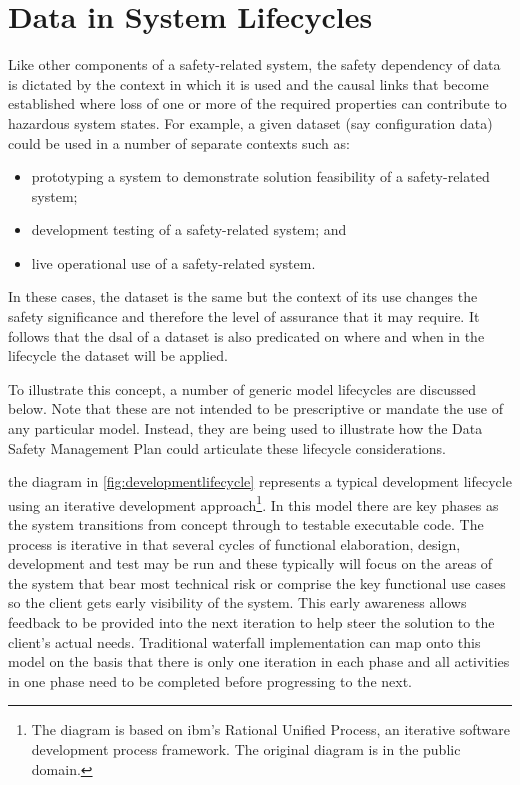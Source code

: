 \section{Data in System Lifecycles}
Like other components of a safety-related system, the safety dependency of data is dictated by the context in which it is used and the causal links that become established where loss of one or more of the required properties can contribute to hazardous system states. For example, a given \gls{dataset} (say \gls{configuration data}) could be used in a number of separate contexts such as:
\begin{itemize}
  \item prototyping a system to demonstrate solution feasibility of a safety-related system;
  \item development testing of a safety-related system; and
  \item live operational use of a safety-related system.
\end{itemize}

In these cases, the \gls{dataset} is the same but the context of its use changes the safety significance and therefore the level of assurance that it may require. It follows that the \gls{dsal} of a \gls{dataset} is also predicated on where and when in the lifecycle the \gls{dataset} will be applied. 

To illustrate this concept, a number of generic model lifecycles are discussed below. Note that these are not intended to be prescriptive or mandate the use of any particular model. Instead, they are being used to illustrate how the Data Safety Management Plan could articulate these lifecycle considerations.

 the diagram in \autoref{fig:developmentlifecycle} represents a typical development lifecycle using an iterative development approach\footnote{The diagram is based on \gls{ibm}'s Rational Unified Process, an iterative software development process framework. The original diagram is in the public domain.}. In this model there are key phases as the system transitions from concept through to testable executable code. The process is iterative in that several cycles of functional elaboration, design, development and test may be run and these typically will focus on the areas of the system that bear most technical risk or comprise the key functional use cases so the client gets early visibility of the system. This early awareness allows feedback to be provided into the next iteration to help steer the solution to the client's actual needs. Traditional waterfall implementation can map onto this model on the basis that there is only one iteration in each phase and all activities in one phase need to be completed before progressing to the next.

